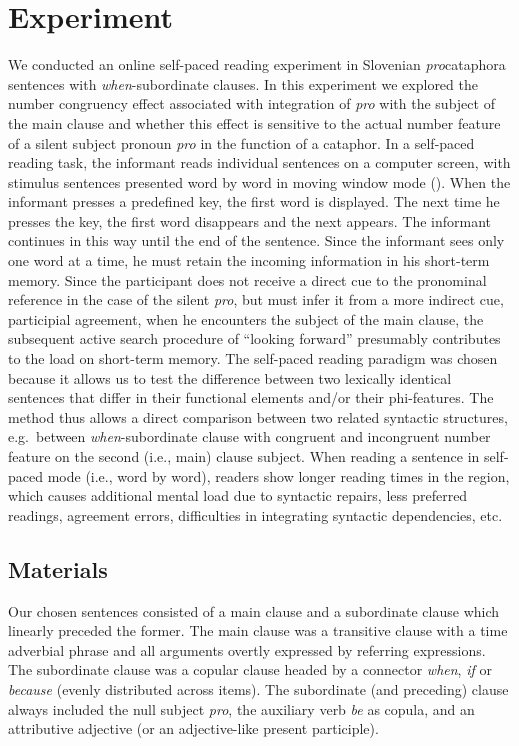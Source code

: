 \documentclass[output=paper,colorlinks,citecolor=brown]{langscibook}
\begin{document}
\section{Experiment}\label{ste-pav:sec:experiment}

We conducted an online self-paced reading experiment in Slovenian \textit{pro}cataphora sentences with \textit{when}-subordinate clauses. In this experiment we explored the number congruency effect associated with integration of \textit{pro} with the subject of the main clause and whether this effect is sensitive to the actual number feature of a silent subject pronoun \textit{pro} in the function of a cataphor. In a self-paced reading task, the informant reads individual sentences on a computer screen, with stimulus sentences presented word by word in moving window mode (\citealt{JustWoolley1982}). When the informant presses a predefined key, the first word is displayed. The next time he presses the key, the first word disappears and the next appears. The informant continues in this way until the end of the sentence. Since the informant sees only one word at a time, he must retain the incoming information in his short-term memory. Since the participant does not receive a direct cue to the pronominal reference in the case of the silent \textit{pro}, but must infer it from a more indirect cue, participial agreement, when he encounters the subject of the main clause, the subsequent active search procedure of ``looking forward'' presumably contributes to the load on short-term memory. The self-paced reading paradigm was chosen because it allows us to test the difference between two lexically identical sentences that differ in their functional elements and/or their phi-features. The method thus allows a direct comparison between two related syntactic structures, e.g.\, between \textit{when}-subordinate clause with congruent and incongruent number feature on the second (i.e., main) clause subject. When reading a sentence in self-paced mode (i.e., word by word), readers show longer reading times in the region, which causes additional mental load due to syntactic repairs, less preferred readings, agreement errors, difficulties in integrating syntactic dependencies, etc.

\subsection{Materials}\label{ste-pav:sec:materials}

Our chosen sentences consisted of a main clause and a subordinate clause which linearly preceded the former. The main clause was a transitive clause with a time adverbial phrase and all arguments overtly expressed by referring expressions. The subordinate clause was a copular clause headed by a connector \textit{when}, \textit{if} or \textit{because} (evenly distributed across items). The subordinate (and preceding) clause always included the null subject \textit{pro}, the auxiliary verb \textit{be} as copula, and an attributive adjective (or an adjective-like present participle). 
\end{document}

